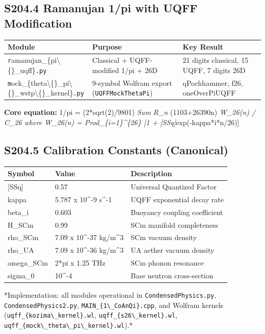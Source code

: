 \documentclass[11pt]{article}
\begin{document}
\subsection*{S204.4 Ramanujan 1/pi with UQFF Modification}

\begin{center}
\begin{longtable}{lll}
\toprule
Module & Purpose & Key Result \tabularnewline
\midrule
\endhead
\verb|r|amanujan\_\{pi\textbackslash\{\}\_uqff\}\verb|.py| & Classical + UQFF-modified 1/pi + 26D & 21 digits classical, 15 UQFF, 7 digits 26D \tabularnewline
\verb|m|ock\_\{theta\textbackslash\{\}\_pi\textbackslash\{\}\_wstp\textbackslash\{\}\_kernel\}\verb|.py| & 9-symbol Wolfram export (\verb|UQFFMockThetaPi|) & qPochhammer, f26, oneOverPiUQFF \tabularnewline
\bottomrule
\end{longtable}
\end{center}

\textbf{Core equation:} 1/pi = (2*sqrt(2)/9801) \emph{ Sum R\_n } (1103+26390n) \emph{ W\_26(n) / C\_26 where W\_26(n) = Prod\_\{i=1\}\textasciicircum{}\{26\} [1 + [SSq]}exp(-kappa*i*n/26)]

\subsection*{S204.5 Calibration Constants (Canonical)}

\begin{center}
\begin{longtable}{lll}
\toprule
Symbol & Value & Description \tabularnewline
\midrule
\endhead
{}[SSq] & 0.57 & Universal Quantized Factor \tabularnewline
kappa & 5.787 x 10\textasciicircum{}-9 s\textasciicircum{}-1 & UQFF exponential decay rate \tabularnewline
beta\_i & 0.603 & Buoyancy coupling coefficient \tabularnewline
H\_SCm & 0.99 & SCm manifold completeness \tabularnewline
rho\_SCm & 7.09 x 10\textasciicircum{}-37 kg/m\textasciicircum{}3 & SCm vacuum density \tabularnewline
rho\_UA & 7.09 x 10\textasciicircum{}-36 kg/m\textasciicircum{}3 & UA aether vacuum density \tabularnewline
omega\_SCm & 2*pi x 1.25 THz & SCm phonon resonance \tabularnewline
sigma\_0 & 10\textasciicircum{}-4 & Base neutron cross-section \tabularnewline
\bottomrule
\end{longtable}
\end{center}

*Implementation: all modules operational in \verb|CondensedPhysics.py|, \verb|CondensedPhysics2.py|, \verb|MAIN_{1\_CoAnQi}.cpp|, and Wolfram kernels (\verb|uqff_{kozima\_kernel}.wl|, \verb|uqff_{s26\_kernel}.wl|, \verb|uqff_{mock\_theta\_pi\_kernel}.wl|).*
\end{document}
